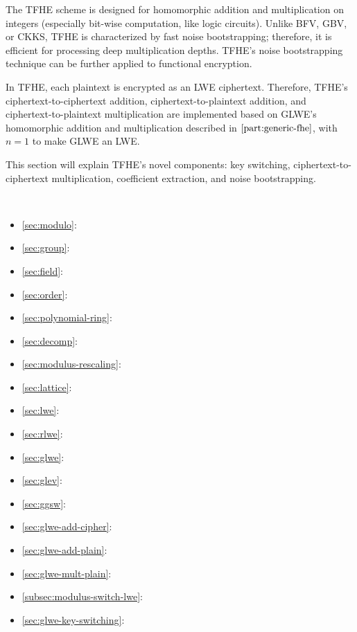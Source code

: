 
The TFHE scheme is designed for homomorphic addition and multiplication on integers (especially bit-wise computation, like logic circuits). Unlike BFV, GBV, or CKKS, TFHE is characterized by fast noise bootstrapping; therefore, it is efficient for processing deep multiplication depths. TFHE's noise bootstrapping technique can be further applied to functional encryption.

In TFHE, each plaintext is encrypted as an LWE ciphertext. Therefore, TFHE's ciphertext-to-ciphertext addition, ciphertext-to-plaintext addition, and ciphertext-to-plaintext multiplication are implemented based on GLWE's homomorphic addition and multiplication described in $\autoref{part:generic-fhe}$, with $n = 1$ to make GLWE an LWE.

This section will explain TFHE's novel components: key switching, ciphertext-to-ciphertext multiplication, coefficient extraction, and noise bootstrapping. 

$ $

\begin{tcolorbox}[
    title = \textbf{Required Background},    %
    colback = white,    %
    colframe = black,  %
    boxrule = 0.8pt,     %
    left = 1mm, right = 1mm, top = 1mm, bottom = 1mm %
]
\begin{itemize}
  \item \autoref{sec:modulo}: 
  \item \autoref{sec:group}: 
  \item \autoref{sec:field}: 
  \item \autoref{sec:order}: 
  \item \autoref{sec:polynomial-ring}: 
  \item \autoref{sec:decomp}: 
  \item \autoref{sec:modulus-rescaling}: 
  \item \autoref{sec:lattice}: 
  \item \autoref{sec:lwe}: 
  \item \autoref{sec:rlwe}: 
  \item \autoref{sec:glwe}: 
  \item \autoref{sec:glev}: 
  \item \autoref{sec:ggsw}: 
  \item \autoref{sec:glwe-add-cipher}: 
  \item \autoref{sec:glwe-add-plain}: 
  \item \autoref{sec:glwe-mult-plain}: 
  \item \autoref{subsec:modulus-switch-lwe}: 
  \item \autoref{sec:glwe-key-switching}: 
\end{itemize}
\end{tcolorbox}

